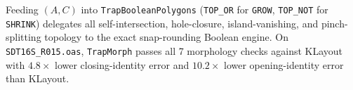 Feeding $(A, C)$ into \texttt{TrapBooleanPolygons} (\texttt{TOP\_OR} for \texttt{GROW}, \texttt{TOP\_NOT} for \texttt{SHRINK}) delegates all self-intersection, hole-closure, island-vanishing, and pinch-splitting topology to the exact snap-rounding Boolean engine. On \texttt{SDT16S\_R015.oas}, \texttt{TrapMorph} passes all 7 morphology checks against KLayout with $4.8\times$ lower closing-identity error and $10.2\times$ lower opening-identity error than KLayout.
